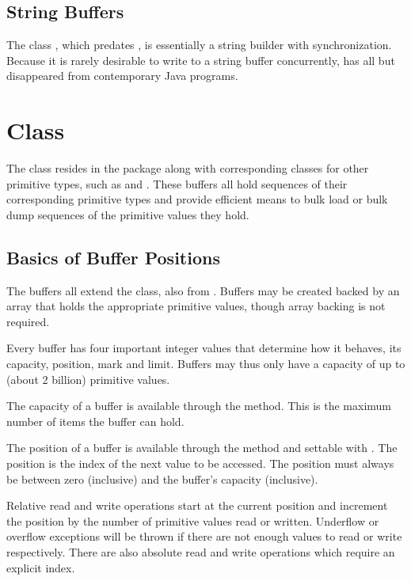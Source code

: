 \subsection{String Buffers}

The class , which predates
, is essentially a string builder with
synchronization.  Because it is rarely desirable to write to a
string buffer concurrently,  has all but
disappeared from contemporary Java programs.


\section{ Class}\label{section:char-charbuffer}

The  class resides in the  package
along with corresponding classes for other primitive types, such as
 and .  These buffers all hold sequences
of their corresponding primitive types and provide efficient means to
bulk load or bulk dump sequences of the primitive values they hold.

\subsection{Basics of Buffer Positions}

The buffers all extend the  class, also from
.  Buffers may be created backed by an array that holds the appropriate
primitive values, though array backing is not required.

Every buffer has four important integer values that determine how it
behaves, its capacity, position, mark and limit.  Buffers may thus
only have a capacity of up to  (about 2
billion) primitive values.  

The capacity of a buffer is available through the 
method.  This is the maximum number of items the buffer can hold.

The position of a buffer is available through the 
method and settable with .  The position is the
index of the next value to be accessed.  The position must always
be between zero (inclusive) and the buffer's capacity (inclusive).

Relative read and write operations start at the current position and
increment the position by the number of primitive values read or
written.  Underflow or overflow exceptions will be thrown if there are
not enough values to read or write respectively.  There are also
absolute read and write operations which require an explicit index.

